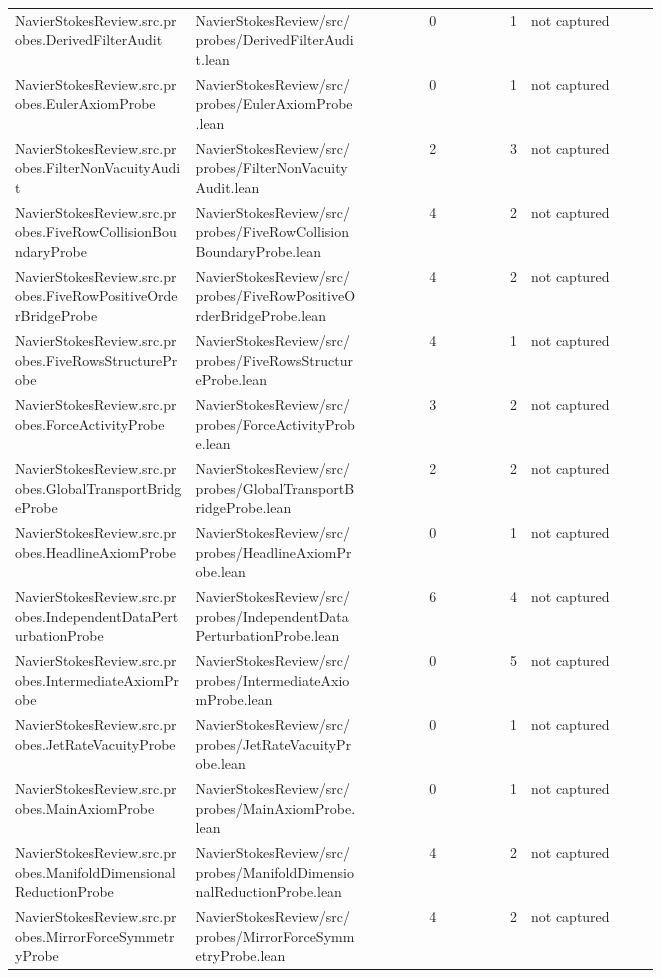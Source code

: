 \documentclass[10pt]{article}
\begin{document}
\begin{longtable}{p{0.28\linewidth}p{0.27\linewidth}r r p{0.20\linewidth}}
NavierStokesReview.src.probes.DerivedFilterAudit & NavierStokesReview/src/probes/DerivedFilterAudit.lean & 0 & 1 & not captured\\
NavierStokesReview.src.probes.EulerAxiomProbe & NavierStokesReview/src/probes/EulerAxiomProbe.lean & 0 & 1 & not captured\\
NavierStokesReview.src.probes.FilterNonVacuityAudit & NavierStokesReview/src/probes/FilterNonVacuityAudit.lean & 2 & 3 & not captured\\
NavierStokesReview.src.probes.FiveRowCollisionBoundaryProbe & NavierStokesReview/src/probes/FiveRowCollisionBoundaryProbe.lean & 4 & 2 & not captured\\
NavierStokesReview.src.probes.FiveRowPositiveOrderBridgeProbe & NavierStokesReview/src/probes/FiveRowPositiveOrderBridgeProbe.lean & 4 & 2 & not captured\\
NavierStokesReview.src.probes.FiveRowsStructureProbe & NavierStokesReview/src/probes/FiveRowsStructureProbe.lean & 4 & 1 & not captured\\
NavierStokesReview.src.probes.ForceActivityProbe & NavierStokesReview/src/probes/ForceActivityProbe.lean & 3 & 2 & not captured\\
NavierStokesReview.src.probes.GlobalTransportBridgeProbe & NavierStokesReview/src/probes/GlobalTransportBridgeProbe.lean & 2 & 2 & not captured\\
NavierStokesReview.src.probes.HeadlineAxiomProbe & NavierStokesReview/src/probes/HeadlineAxiomProbe.lean & 0 & 1 & not captured\\
NavierStokesReview.src.probes.IndependentDataPerturbationProbe & NavierStokesReview/src/probes/IndependentDataPerturbationProbe.lean & 6 & 4 & not captured\\
NavierStokesReview.src.probes.IntermediateAxiomProbe & NavierStokesReview/src/probes/IntermediateAxiomProbe.lean & 0 & 5 & not captured\\
NavierStokesReview.src.probes.JetRateVacuityProbe & NavierStokesReview/src/probes/JetRateVacuityProbe.lean & 0 & 1 & not captured\\
NavierStokesReview.src.probes.MainAxiomProbe & NavierStokesReview/src/probes/MainAxiomProbe.lean & 0 & 1 & not captured\\
NavierStokesReview.src.probes.ManifoldDimensionalReductionProbe & NavierStokesReview/src/probes/ManifoldDimensionalReductionProbe.lean & 4 & 2 & not captured\\
NavierStokesReview.src.probes.MirrorForceSymmetryProbe & NavierStokesReview/src/probes/MirrorForceSymmetryProbe.lean & 4 & 2 & not captured\\

\end{longtable}
\end{document}
